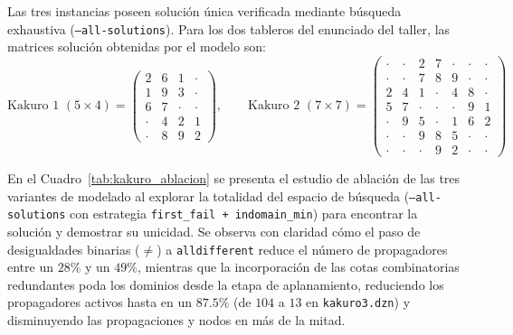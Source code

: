 Las tres instancias poseen solución única verificada mediante búsqueda exhaustiva (\texttt{--all-solutions}). Para los dos tableros del enunciado del taller, las matrices solución obtenidas por el modelo son:
\[
\text{Kakuro 1 } (5 \times 4) =
\begin{pmatrix}
2 & 6 & 1 & \cdot \\
1 & 9 & 3 & \cdot \\
6 & 7 & \cdot & \cdot \\
\cdot & 4 & 2 & 1 \\
\cdot & 8 & 9 & 2
\end{pmatrix},
\qquad
\text{Kakuro 2 } (7 \times 7) =
\begin{pmatrix}
\cdot & \cdot & 2 & 7 & \cdot & \cdot & \cdot \\
\cdot & \cdot & 7 & 8 & 9 & \cdot & \cdot \\
2 & 4 & 1 & \cdot & 4 & 8 & \cdot \\
5 & 7 & \cdot & \cdot & \cdot & 9 & 1 \\
\cdot & 9 & 5 & \cdot & 1 & 6 & 2 \\
\cdot & \cdot & 9 & 8 & 5 & \cdot & \cdot \\
\cdot & \cdot & \cdot & 9 & 2 & \cdot & \cdot
\end{pmatrix}
\]

En el Cuadro~\ref{tab:kakuro_ablacion} se presenta el estudio de ablación de las tres variantes de modelado al explorar la totalidad del espacio de búsqueda (\texttt{--all-solutions} con estrategia \texttt{first\_fail + indomain\_min}) para encontrar la solución y demostrar su unicidad. Se observa con claridad cómo el paso de desigualdades binarias ($\neq$) a \texttt{alldifferent} reduce el número de propagadores entre un $28\%$ y un $49\%$, mientras que la incorporación de las cotas combinatorias redundantes poda los dominios desde la etapa de aplanamiento, reduciendo los propagadores activos hasta en un $87.5\%$ (de $104$ a $13$ en \texttt{kakuro3.dzn}) y disminuyendo las propagaciones y nodos en más de la mitad.

